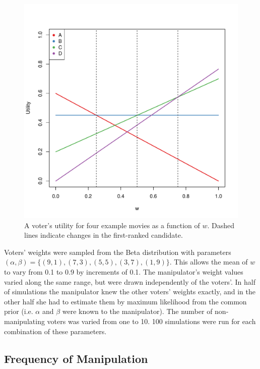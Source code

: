 \documentclass[12pt,letterpaper]{article} %
\begin{document}
\begin{figure}
\begin{center}
\includegraphics[scale=0.4]{../graphics/fakeUtils.pdf}
\caption{A voter's utility for four example movies as a function of $w$. Dashed lines indicate changes in the first-ranked candidate.}
\label{fake-utils}
\end{center}
\end{figure}

Voters' weights were sampled from the Beta distribution with parameters $(\alpha, \beta) = \{ (9,1), (7,3), (5,5), (3,7), (1,9) \}$. This allows the mean of $w$ to vary from 0.1 to 0.9 by increments of 0.1. The manipulator's weight values varied along the same range, but were drawn independently of the voters'. In half of simulations the manipulator knew the other voters' weights exactly, and in the other half she had to estimate them by maximum likelihood from the common prior (i.e. $\alpha$ and $\beta$ were known to the manipulator). The number of non-manipulating voters was varied from one to 10. 100 simulations were run for each combination of these parameters.




\subsection{Frequency of Manipulation}
\end{document}
